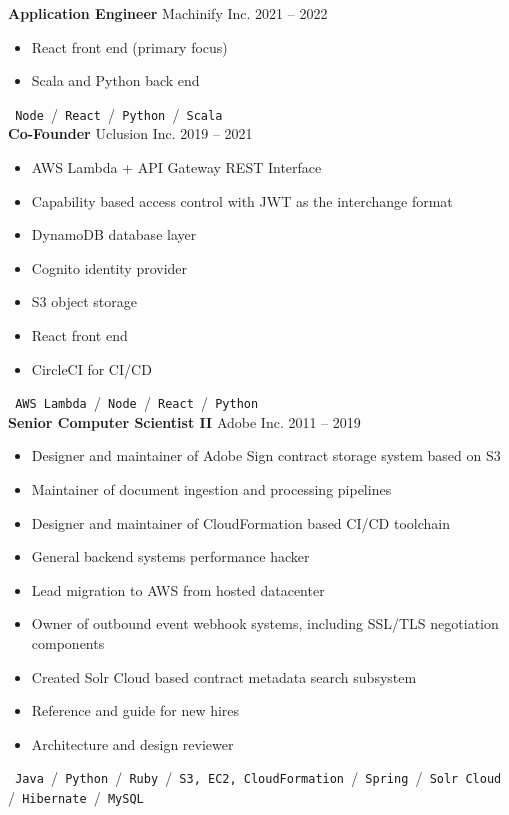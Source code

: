 \documentclass{res}
\begin{document}
        {\bf Application Engineer} \hfill Machinify Inc. \hfill 2021 -- 2022
        \begin{itemize}
        \item React front end (primary focus)
        \item Scala and Python back end
        \end{itemize}
        \texttt{ Node }\slash\texttt{ React }\slash\texttt{ Python }\slash\texttt{ Scala }\\

        {\bf Co-Founder} \hfill Uclusion Inc. \hfill 2019 -- 2021
        \begin{itemize}
        \item AWS Lambda + API Gateway REST Interface
        \item Capability based access control with JWT as the interchange format
        \item DynamoDB database layer
        \item Cognito identity provider
        \item S3 object storage
        \item React front end
        \item CircleCI for CI/CD
        \end{itemize}
        \texttt{ AWS Lambda }\slash\texttt{ Node }\slash\texttt{ React }\slash\texttt{ Python }\\
        
        {\bf Senior Computer Scientist II} \hfill Adobe Inc. \hfill 2011 -- 2019
        \begin{itemize}
        \item Designer and maintainer of Adobe Sign contract storage system based on S3
        \item Maintainer of document ingestion and processing pipelines
        \item Designer and maintainer of CloudFormation based CI/CD toolchain
        \item General backend systems performance hacker
        \item Lead migration to AWS from hosted datacenter
        \item Owner of outbound event webhook systems, including SSL/TLS negotiation components
        \item Created Solr Cloud based contract metadata search subsystem
        \item Reference and guide for new hires
        \item Architecture and design reviewer
        \end{itemize}
	\texttt{ Java }\slash\texttt{ Python }\slash\texttt{ Ruby }\slash\texttt{ S3, EC2, CloudFormation }\slash\texttt{ Spring }\slash\texttt{ Solr Cloud }\slash\texttt{ Hibernate }\slash\texttt{ MySQL }
        
\end{document}
